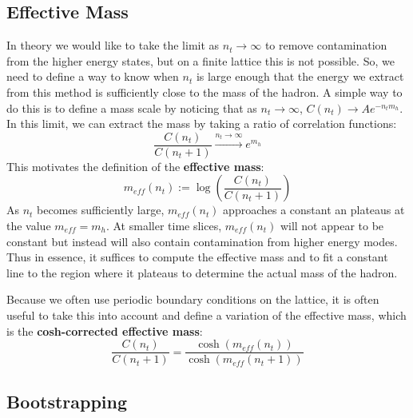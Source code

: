 \documentclass[11pt, oneside]{article}   	%
\theoremstyle{definition}
\begin{document}
\subsection{Effective Mass}

In theory we would like to take the limit as $n_t\rightarrow\infty$ to remove contamination from the higher energy 
states, but on a finite lattice this is not possible. So, we need to define a way to know when $n_t$ is large enough 
that the energy we extract from this method is sufficiently close to the mass of the hadron. A simple way to do this 
is to define a mass scale by noticing that as $n_t\rightarrow\infty$, $C(n_t)\rightarrow Ae^{-n_t m_h}$. 
In this limit, we can extract the mass by taking a ratio of correlation functions:
\begin{equation}
	\frac{C(n_t)}{C(n_t + 1)}\xrightarrow{n_t\rightarrow\infty} e^{m_h}
\end{equation}
This motivates the definition of the \textbf{effective mass}:
\begin{equation}
	m_{eff}(n_t) := \log\left(\frac{C(n_t)}{C(n_t + 1)}\right)
\end{equation}
As $n_t$ becomes sufficiently large, $m_{eff}(n_t)$ approaches a constant an plateaus at the value $m_{eff} = m_h$. 
At smaller time slices, $m_{eff}(n_t)$ will not appear to be constant but instead will also contain contamination from 
higher energy modes. Thus in essence, it suffices to compute the effective mass and to fit a constant line to the 
region where it plateaus to determine the actual mass of the hadron. 

Because we often use periodic boundary conditions on the lattice, it is often useful to take this into account and 
define a variation of the effective mass, which is the \textbf{cosh-corrected effective mass}:
\begin{equation}
	\frac{C(n_t)}{C(n_t + 1)} = \frac{\cosh(m_{eff}(n_t))}{\cosh(m_{eff}(n_t + 1))}
\end{equation}

\subsection{Bootstrapping}
\end{document}
